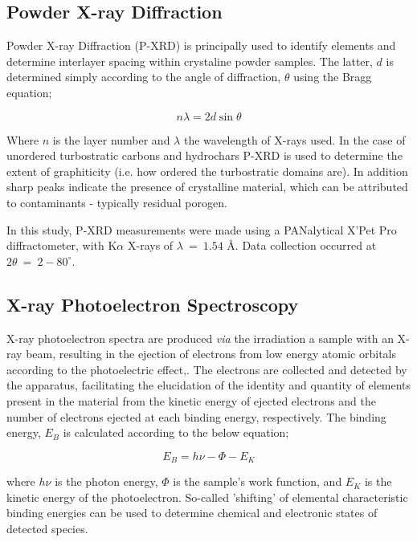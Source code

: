 \subsection{Powder X-ray Diffraction}

Powder X-ray Diffraction (P-XRD) is principally used to identify elements and determine interlayer spacing within crystaline powder samples. The latter, $d$ is determined simply according to the angle of diffraction, $\theta$ using the Bragg equation;

\begin{equation}
    n\lambda = 2 d \sin{\theta}
\end{equation}

Where $n$ is the layer number and $\lambda$ the wavelength of X-rays used.\citep{woolfson1997introduction} In the case of unordered turbostratic carbons and hydrochars P-XRD is used to determine the extent of graphiticity (i.e. how ordered the turbostratic domains are). In addition sharp peaks indicate the presence of crystalline material, which can be attributed to contaminants - typically residual porogen.

In this study, P-XRD measurements were made using a PANalytical X’Pet Pro diffractometer, with K$\alpha$ X-rays of $\lambda\ =\ 1.54$ \AA. Data collection occurred at $2\theta\ =\ 2-80^{\circ}$.

\subsection{X-ray Photoelectron Spectroscopy}

X-ray photoelectron spectra are produced \textit{via} the irradiation a sample with an X-ray beam, resulting in the ejection of electrons from low energy atomic orbitals according to the photoelectric effect,\citep{richardson1912liii}. The electrons are collected and detected by the apparatus, facilitating the elucidation of the identity and quantity of elements present in the material from the kinetic energy of ejected electrons and the number of electrons ejected at each binding energy, respectively. The binding energy, $E_B$ is calculated according to the below equation;

\begin{equation}
    E_B = h\nu - \Phi - E_K
\end{equation}

where $h\nu$ is the photon energy, $\Phi$ is the sample’s work function, and $E_K$ is the kinetic energy of the photoelectron. So-called 'shifting' of elemental characteristic binding energies can be used to determine chemical and electronic states of detected species.\citep{moulder1995handbook}

